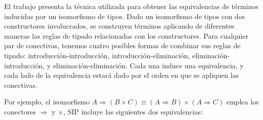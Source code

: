 \documentclass[]{report}
\begin{document}
	El trabajo presenta la técnica utilizada para obtener las equivalencias de términos inducidas por un isomorfismo de tipos.
	Dado un isomorfismo de tipos con dos constructores involucrados, se construyen términos aplicando de diferentes maneras las reglas de tipado relacionadas con los constructores.
	Para cualquier par de conectivas, tenemos cuatro posibles formas de combinar sus reglas de tipado: introducción-introducción, introducción-eliminación, eliminación-introducción, y eliminación-eliminación.
	Cada una induce una equivalencia, y cada lado de la equivalencia estará dado por el orden en que se apliquen las conectivas.
	
	Por ejemplo, el isomorfismo $A \Rightarrow (B \times C) \equiv (A \Rightarrow B) \times (A \Rightarrow C)$ emplea los conectores $\Rightarrow$ y $\times$, SIP incluye las siguientes dos equivalencias:
	
\end{document}
